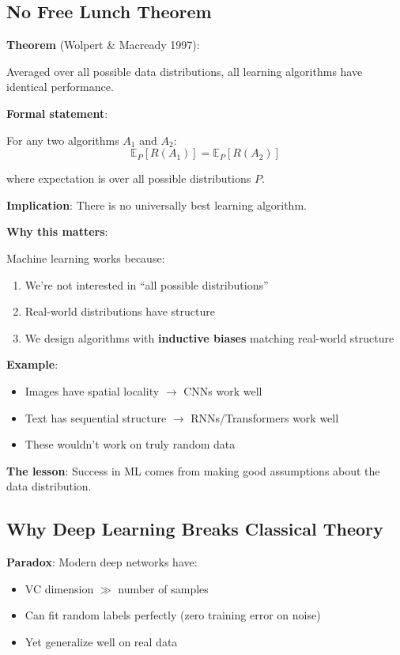 \documentclass[11pt,oneside]{book}
\begin{document}
\subsection{No Free Lunch Theorem}

\textbf{Theorem} (Wolpert \& Macready 1997):

Averaged over all possible data distributions, all learning algorithms have identical performance.

\textbf{Formal statement}:

For any two algorithms $A_1$ and $A_2$:
\begin{equation}
\mathbb{E}_P [R(A_1)] = \mathbb{E}_P [R(A_2)]
\end{equation}

where expectation is over all possible distributions $P$.

\textbf{Implication}: There is no universally best learning algorithm.

\textbf{Why this matters}:

Machine learning works because:
\begin{enumerate}
    \item We're not interested in ``all possible distributions''
    \item Real-world distributions have structure
    \item We design algorithms with \textbf{inductive biases} matching real-world structure
\end{enumerate}

\textbf{Example}:
\begin{itemize}
    \item Images have spatial locality $\rightarrow$ CNNs work well
    \item Text has sequential structure $\rightarrow$ RNNs/Transformers work well
    \item These wouldn't work on truly random data
\end{itemize}

\begin{insightbox}
\textbf{The lesson}: Success in ML comes from making good assumptions about the data distribution.
\end{insightbox}

\subsection{Why Deep Learning Breaks Classical Theory}

\textbf{Paradox}: Modern deep networks have:
\begin{itemize}
    \item VC dimension $\gg$ number of samples
    \item Can fit random labels perfectly (zero training error on noise)
    \item Yet generalize well on real data
\end{itemize}
\end{document}
